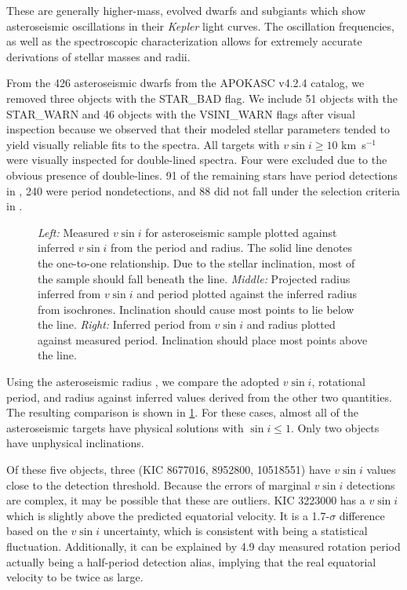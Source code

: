 \documentclass[manuscript]{aastex6}
\newcommand{\vsini}{\ensuremath{v \sin i}}
\newcommand{\Kepler}{\mbox{\textit{Kepler}}}
\newcommand{\kms}{\textrm{km~s}\ensuremath{^{-1}}}
\begin{document}
These are generally higher-mass, evolved dwarfs
and subgiants which show asteroseismic oscillations in their \Kepler{} light
curves. The oscillation frequencies, as well as the spectroscopic
characterization allows for extremely accurate derivations of stellar masses
and radii.

From the 426 asteroseismic dwarfs from the APOKASC v4.2.4 catalog, we removed 
three objects with the STAR\_BAD flag. We include 51 objects with 
the STAR\_WARN and 46 objects with the VSINI\_WARN flags after visual 
inspection because we observed that their modeled stellar parameters tended to
yield visually reliable fits to the spectra.  All targets with \(\vsini \ge
10\) \kms{} were visually
inspected for double-lined spectra. Four were excluded due to the obvious
presence of double-lines. 91 of the remaining stars have period detections in 
\citet{McQuillan14}, 240 were period nondetections, and 88 did not fall under 
the selection criteria in \citet{McQuillan14}. 

\begin{figure}
    \caption{\emph{Left:} Measured \vsini{} for asteroseismic sample plotted
        against inferred \vsini{} from the period and radius. The solid line 
        denotes the one-to-one relationship. Due to the stellar inclination, most
        of the sample should fall beneath the line. \emph{Middle:} Projected
        radius inferred from \vsini{} and period plotted against the inferred
        radius from isochrones. Inclination should cause most points to lie
        below the line. \emph{Right:} Inferred period from \vsini{} and radius
        plotted against measured period. Inclination should place most points
    above the line.\label{fig:astero_rot}}
\end{figure}

Using the asteroseismic radius \citep{Serenelli17}, we compare the adopted
\vsini{}, rotational period, and radius against inferred values derived from
the other two quantities. The resulting comparison is shown in
\cref{fig:astero_rot}. For these cases, almost all of the asteroseismic 
targets have physical solutions with \(\sin i \le 1\). Only two objects have
unphysical inclinations.

Of these five objects, three (KIC 8677016, 8952800, 10518551) have
\vsini{} values close to the detection threshold. Because the errors of 
marginal \vsini{} detections are complex, 
it may be possible that these are outliers. KIC 3223000 has a
\vsini{} which is slightly above the predicted equatorial velocity. It
is a 1.7-\(\sigma\) difference based on the \vsini{} uncertainty, which
is consistent with being a statistical fluctuation. Additionally, it can
be explained by 4.9 day measured rotation period actually being a 
half-period detection alias, implying that the real equatorial velocity to be twice 
as large. 
\end{document}
